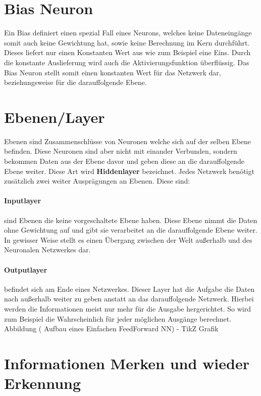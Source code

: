 \section{Bias Neuron}
\label{sec:Bias Neuron}

Ein Bias definiert einen spezial Fall eines Neurons, welches keine Dateneingänge somit auch keine Gewichtung hat, sowie keine Berechnung im Kern durchführt. 
Dieses liefert nur einen Konstanten Wert aus wie zum Beispiel eine Eins. 
Durch die konstante Auslieferung wird auch die Aktivierungsfunktion überflüssig. 
Das Bias Neuron stellt somit einen konstanten Wert für das Netzwerk dar, beziehungsweise für die darauffolgende Ebene.

\section{Ebenen/Layer}
\label{sec:Layer}

Ebenen sind Zusammenschlüsse von Neuronen welche sich auf der selben Ebene befinden. 
Diese Neuronen sind aber nicht mit einander Verbunden, sondern bekommen Daten aus der Ebene davor und geben diese an die darauffolgende Ebene weiter. 
Diese Art wird \textbf{Hiddenlayer} bezeichnet. 
Jedes Netzwerk benötigt zusätzlich zwei weiter Ausprägungen an Ebenen. 
Diese sind:

\paragraph{Inputlayer} sind Ebenen die keine vorgeschaltete Ebene haben. 
Diese Ebene nimmt die Daten ohne Gewichtung auf und gibt sie verarbeitet an die darauffolgende Ebene weiter. 
In gewisser Weise stellt es einen Übergang zwischen der Welt außerhalb und des Neuronalen Netzwerkes dar.

\paragraph{Outputlayer} befindet sich am Ende eines Netzwerkes. 
Dieser Layer hat die Aufgabe die Daten nach außerhalb weiter zu geben anstatt an das darauffolgende Netzwerk. 
Hierbei werden die Informationen meist nur mehr für die Ausgabe hergerichtet. 
So wird zum Beispiel die Wahrscheinlich für jeder möglichen Ausgänge berechnet.
\\

Abbildung ( Aufbau eines Einfachen FeedForward NN) - TikZ Grafik

\section{Informationen Merken und wieder Erkennung}

